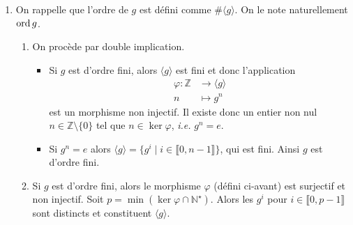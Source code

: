 \documentclass[./main]{subfiles}
\begin{document}
  \begin{enumerate}
    \item On rappelle que l'ordre de $g$ est défini comme $\# \langle g\rangle$.
      On le note naturellement $\operatorname{ord} g$.
      \begin{enumerate}
        \item On procède par double implication.
          \begin{itemize}
            \item Si $g$ est d'ordre fini, alors $\langle g\rangle$ est fini et donc l'application
               \begin{align*}
                \varphi: \mathds{Z} &\longrightarrow \langle g\rangle \\
                n &\longmapsto g^n
              \end{align*}
              est un morphisme non injectif. Il existe donc un entier non nul $n \in \mathds{Z} \setminus \{0\}$ tel que $n \in \ker \varphi$, \textit{i.e.} $g^n = e$.
            \item Si $g^n = e$ alors $\langle g \rangle = \{g^i  \mid i \in  \llbracket 0, n - 1 \rrbracket \}$, qui est fini. Ainsi $g$ est d'ordre fini.
          \end{itemize}
        \item Si $g$ est d'ordre fini, alors  le morphisme $\varphi$ (défini ci-avant) est surjectif et non injectif.
          Soit $p = \min (\ker \varphi \cap \mathds{N}^\star)$.
          Alors les $g^i$ pour $i \in \llbracket 0, p-1\rrbracket$ sont distincts et constituent $\langle g\rangle$.


\end{enumerate}
\end{enumerate}
\end{document}
